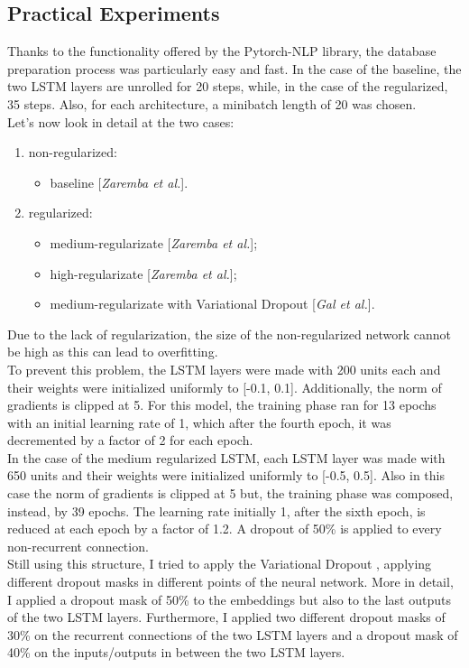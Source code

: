 \documentclass[a4paper]{article}
\begin{document}
\subsection{Practical Experiments}
Thanks to the functionality offered by the Pytorch-NLP library, the database preparation process was particularly easy and fast. In the case of the baseline, the two LSTM layers are unrolled for 20 steps, while, in the case of the regularized, 35 steps. Also, for each architecture, a minibatch length of 20 was chosen.
\\
Let's now look in detail at the two cases: 
\begin{enumerate}
    \item non-regularized:
    \begin{itemize}
        \item baseline [\textit{Zaremba et al.}].
    \end{itemize}
    \item regularized:
    \begin{itemize}
        \item medium-regularizate [\textit{Zaremba et al.}];
        \item high-regularizate [\textit{Zaremba et al.}];
        \item medium-regularizate with Variational Dropout [\textit{Gal et al.}].
    \end{itemize}
\end{enumerate}
Due to the lack of regularization, the size of the non-regularized network cannot be high as this can lead to overfitting.
\\
To prevent this problem, the LSTM layers were made with 200 units each and their weights were initialized uniformly to [-0.1, 0.1]. Additionally, the norm of gradients is clipped at 5. For this model, the training phase ran for 13 epochs with an initial learning rate of 1, which after the fourth epoch, it was decremented by a factor of 2 for each epoch.
\\
In the case of the medium regularized LSTM, each LSTM layer was made with 650 units and their weights were initialized uniformly to [-0.5, 0.5]. Also in this case the norm of gradients is clipped at 5 but, the training phase was composed, instead, by 39 epochs. The learning rate initially 1, after the sixth epoch, is reduced at each epoch by a factor of 1.2. A dropout of 50\% is applied to every non-recurrent connection.
\\
Still using this structure, I tried to apply the Variational Dropout \cite{gal-dropout}, applying different dropout masks in different points of the neural network. More in detail, I applied a dropout mask of 50\% to the embeddings but also to the last outputs of the two LSTM layers. Furthermore, I applied two different dropout masks of 30\% on the recurrent connections of the two LSTM layers and a dropout mask of 40\% on the inputs/outputs in between the two LSTM layers.
\end{document}
